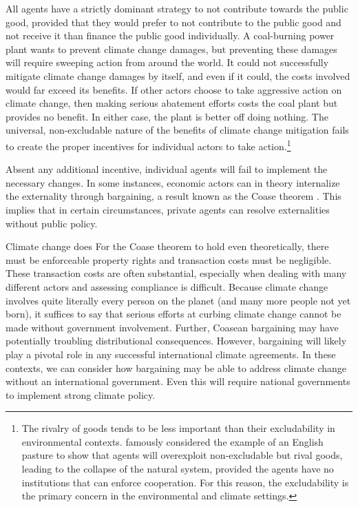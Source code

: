 All agents have a strictly dominant strategy to not contribute towards the public good, provided that they would prefer to not contribute to the public good and not receive it than finance the public good individually. A coal-burning power plant wants to prevent climate change damages, but preventing these damages will require sweeping action from around the world. It could not successfully mitigate climate change damages by itself, and even if it could, the costs involved would far exceed its benefits. If other actors choose to take aggressive action on climate change, then making serious abatement efforts costs the coal plant but provides no benefit. In either case, the plant is better off doing nothing. The universal, non-excludable nature of the benefits of climate change mitigation fails to create the proper incentives for individual actors to take action.\footnote{The rivalry of goods tends to be less important than their excludability in environmental contexts. \cite{hardin1968tragedy} famously considered the example of an English pasture to show that agents will overexploit non-excludable but rival goods, leading to the collapse of the natural system, provided the agents have no institutions that can enforce cooperation. For this reason, the excludability is the primary concern in the environmental and climate settings.}

Absent any additional incentive, individual agents will fail to implement the necessary changes. In some instances, economic actors can in theory internalize the externality through bargaining, a result known as the Coase theorem \citep{coase1960problem}. This implies that in certain circumstances, private agents can resolve externalities without public policy. 

Climate change does 
For the Coase theorem to hold even theoretically, there must be enforceable property rights and transaction costs must be negligible. These transaction costs are often substantial, especially when dealing with many different actors and assessing compliance is difficult. Because climate change involves quite literally every person on the planet (and many more people not yet born), it suffices to say that serious efforts at curbing climate change cannot be made without government involvement. Further, Coasean bargaining may have potentially troubling distributional consequences. However, bargaining will likely play a pivotal role in any successful international climate agreements. In these contexts, we can consider how bargaining may be able to address climate change without an international government. Even this will require national governments to implement strong climate policy.

